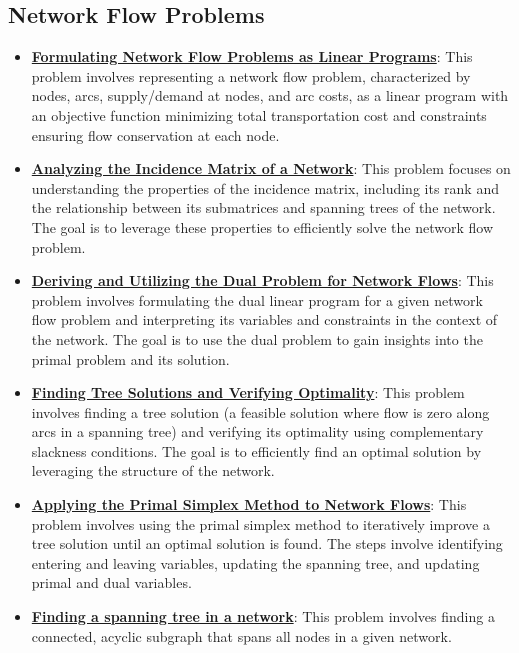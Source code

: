\documentclass{article}%
\begin{document}
%
\subsection{Network Flow Problems}%
\label{subsec:NetworkFlowProblems}%
\begin{itemize}[leftmargin=*]%
\item \href{https://www.math.purdue.edu/~yipn/421//2024-11-05-NetFlows.pdf#page=2}{\textbf{Formulating Network Flow Problems as Linear Programs}}: This problem involves representing a network flow problem, characterized by nodes, arcs, supply/demand at nodes, and arc costs, as a linear program with an objective function minimizing total transportation cost and constraints ensuring flow conservation at each node.%
\item \href{https://www.math.purdue.edu/~yipn/421//2024-11-05-NetFlows.pdf#page=5}{\textbf{Analyzing the Incidence Matrix of a Network}}: This problem focuses on understanding the properties of the incidence matrix, including its rank and the relationship between its submatrices and spanning trees of the network.  The goal is to leverage these properties to efficiently solve the network flow problem.%
\item \href{https://www.math.purdue.edu/~yipn/421//2024-11-05-NetFlows.pdf#page=7}{\textbf{Deriving and Utilizing the Dual Problem for Network Flows}}: This problem involves formulating the dual linear program for a given network flow problem and interpreting its variables and constraints in the context of the network.  The goal is to use the dual problem to gain insights into the primal problem and its solution.%
\item \href{https://www.math.purdue.edu/~yipn/421//2024-11-05-NetFlows.pdf#page=10}{\textbf{Finding Tree Solutions and Verifying Optimality}}: This problem involves finding a tree solution (a feasible solution where flow is zero along arcs in a spanning tree) and verifying its optimality using complementary slackness conditions.  The goal is to efficiently find an optimal solution by leveraging the structure of the network.%
\item \href{https://www.math.purdue.edu/~yipn/421//2024-11-05-NetFlows.pdf#page=22}{\textbf{Applying the Primal Simplex Method to Network Flows}}: This problem involves using the primal simplex method to iteratively improve a tree solution until an optimal solution is found.  The steps involve identifying entering and leaving variables, updating the spanning tree, and updating primal and dual variables.%
\item \href{https://www.math.purdue.edu/~yipn/421//2024-11-07-NetSimplex.pdf#page=1}{\textbf{Finding a spanning tree in a network}}: This problem involves finding a connected, acyclic subgraph that spans all nodes in a given network.%

\end{itemize}
\end{document}
